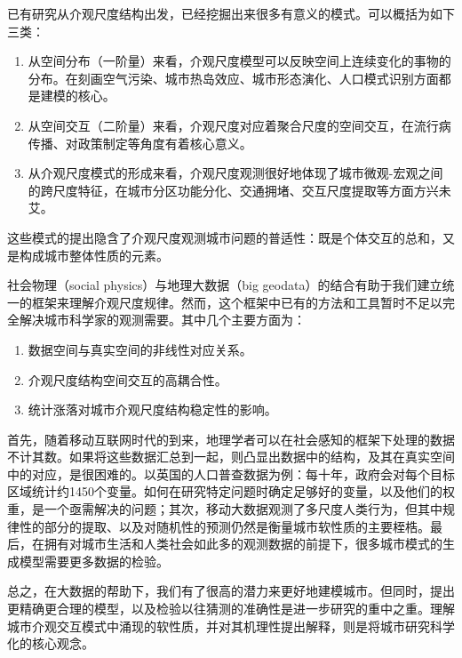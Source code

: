 
已有研究从介观尺度结构出发，已经挖掘出来很多有意义的模式。可以概括为如下三类：\begin{enumerate}
    \item 从空间分布（一阶量）来看，介观尺度模型可以反映空间上连续变化的事物的分布。在刻画空气污染\cite{mijling2012using}、城市热岛效应、城市形态演化\cite{raimbault2018calibration}、人口模式识别方面都是建模的核心。
    \item 从空间交互（二阶量）来看，介观尺度对应着聚合尺度的空间交互，在流行病传播、对政策制定等角度有着核心意义。%
    \item 从介观尺度模式的形成来看，介观尺度观测很好地体现了城市微观-宏观之间的跨尺度特征，在城市分区功能分化、交通拥堵、交互尺度提取等方面方兴未艾。
\end{enumerate} 这些模式的提出隐含了介观尺度观测城市问题的普适性：既是个体交互的总和，又是构成城市整体性质的元素。


社会物理（social physics）与地理大数据（big geodata）的结合有助于我们建立统一的框架来理解介观尺度规律。然而，这个框架中已有的方法和工具暂时不足以完全解决城市科学家的观测需要。其中几个主要方面为：\begin{enumerate}
    \item 数据空间与真实空间的非线性对应关系。
    \item 介观尺度结构空间交互的高耦合性。
    \item 统计涨落对城市介观尺度结构稳定性的影响。
\end{enumerate} 首先，随着移动互联网时代的到来，地理学者可以在社会感知的框架下处理的数据不计其数。如果将这些数据汇总到一起，则凸显出数据中的结构，及其在真实空间中的对应，是很困难的。以英国的人口普查数据为例：每十年，政府会对每个目标区域统计约1450个变量。如何在研究特定问题时确定足够好的变量，以及他们的权重，是一个亟需解决的问题；其次，移动大数据观测了多尺度人类行为，但其中规律性的部分的提取、以及对随机性的预测仍然是衡量城市软性质的主要桎梏\cite{song2010limits,barter2019manifold,dalziel2013human}。最后，在拥有对城市生活和人类社会如此多的观测数据的前提下，很多城市模式的生成模型需要更多数据的检验\cite{makse1995modelling,wilson2003development,rozenfeld2008laws}。


总之，在大数据的帮助下，我们有了很高的潜力来更好地建模城市。但同时，提出更精确更合理的模型，以及检验以往猜测的准确性是进一步研究的重中之重。理解城市介观交互模式中涌现的软性质，并对其机理性提出解释，则是将城市研究科学化的核心观念。


